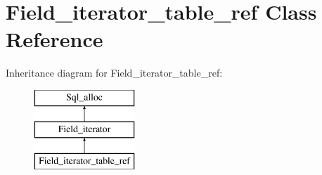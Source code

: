 \hypertarget{classField__iterator__table__ref}{}\section{Field\+\_\+iterator\+\_\+table\+\_\+ref Class Reference}
\label{classField__iterator__table__ref}
Inheritance diagram for Field\+\_\+iterator\+\_\+table\+\_\+ref\+:\begin{figure}[H]
\begin{center}
\leavevmode
\includegraphics[height=3.000000cm]{classField__iterator__table__ref}
\end{center}
\end{figure}

